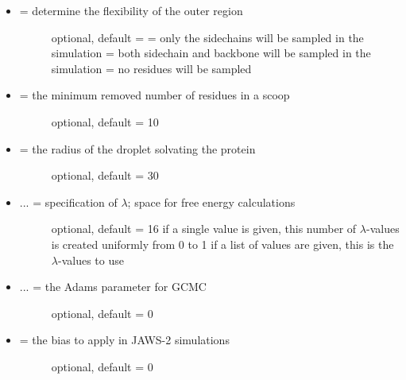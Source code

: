 \documentclass[letterpaper,10pt,english]{sphinxmanual}
\begin{document}
\begin{itemize}
\begin{description}
\end{description}

\item {} \begin{description}
\item[{ = determine the flexibility of the outer region}] \leavevmode
optional, default = 
 = only the sidechains will be sampled in the simulation
 = both sidechain and backbone will be sampled in the simulation
 = no residues will be sampled

\end{description}

\item {} \begin{description}
\item[{ = the minimum removed number of residues in a scoop}] \leavevmode
optional, default = 10

\end{description}

\item {} \begin{description}
\item[{ = the radius of the droplet solvating the protein}] \leavevmode
optional, default = 30

\end{description}

\item {} \begin{description}
\item[{ ... = specification of \(\lambda\); space for free energy calculations}] \leavevmode
optional, default = 16
if a single value is given, this number of \(\lambda\)-values is created uniformly from 0 to 1
if a list of values are given, this is the \(\lambda\)-values to use

\end{description}

\item {} \begin{description}
\item[{ ... = the Adams parameter for GCMC}] \leavevmode
optional, default = 0

\end{description}

\item {} \begin{description}
\item[{ = the bias to apply in JAWS-2 simulations}] \leavevmode
optional, default = 0


\end{description}
\end{itemize}
\end{document}
